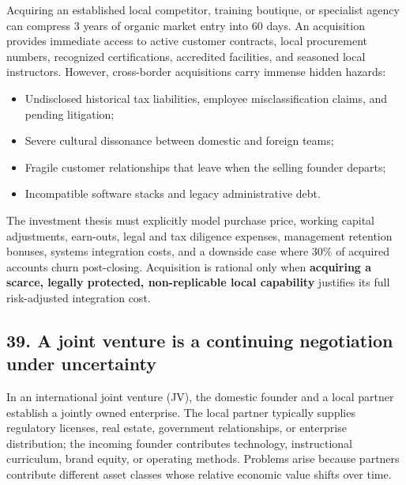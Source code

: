 Acquiring an established local competitor, training boutique, or specialist agency can compress 3 years of organic market entry into 60 days. An acquisition provides immediate access to active customer contracts, local procurement numbers, recognized certifications, accredited facilities, and seasoned local instructors. However, cross-border acquisitions carry immense hidden hazards:
\begin{itemize}
    \item Undisclosed historical tax liabilities, employee misclassification claims, and pending litigation;
    \item Severe cultural dissonance between domestic and foreign teams;
    \item Fragile customer relationships that leave when the selling founder departs;
    \item Incompatible software stacks and legacy administrative debt.
\end{itemize}
The investment thesis must explicitly model purchase price, working capital adjustments, earn-outs, legal and tax diligence expenses, management retention bonuses, systems integration costs, and a downside case where 30\% of acquired accounts churn post-closing. Acquisition is rational only when \textbf{acquiring a scarce, legally protected, non-replicable local capability} justifies its full risk-adjusted integration cost.

\subsection{39. A joint venture is a continuing negotiation under uncertainty}

In an international joint venture (JV), the domestic founder and a local partner establish a jointly owned enterprise. The local partner typically supplies regulatory licenses, real estate, government relationships, or enterprise distribution; the incoming founder contributes technology, instructional curriculum, brand equity, or operating methods. Problems arise because partners contribute different asset classes whose relative economic value shifts over time.

